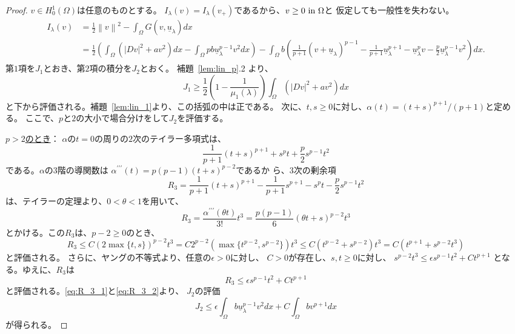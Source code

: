 \begin{proof}
 $v \in H_0^1(\Omega)$は任意のものとする。
 $I_\lambda(v) = I_\lambda(v_+)$であるから、$v \geq 0 ~\text{in}~ \Omega$と
 仮定しても一般性を失わない。
 \begin{align*}
  I_\lambda(v) &= \frac{1}{2} \left\| v \right\|^2 - \int_\Omega G(v,
  \underline{u}_\lambda)dx \\
  &= \frac{1}{2} \left( \int_\Omega \left( \lvert Dv \rvert^2 + a v^2
  \right) dx -\int_\Omega pb\underline{u}_\lambda^{p-1} v^2 dx
  \right)
  - \int_\Omega b \left( \frac{1}{p+1}(v +
  \underline{u}_\lambda)^{p-1} - \frac{1}{p+1}
  \underline{u}_\lambda^{p+1} - \underline{u}_\lambda^p v -
  \frac{p}{2} \underline{u}_\lambda^{p-1} v^2 \right) dx.
 \end{align*}
 第$1$項を$J_1$とおき、第$2$項の積分を$J_2$とおく。
 補題~\ref{lem:lin_p}.2 より、
 \begin{equation}
  J_1 \geq \frac{1}{2} \left( 1 - \frac{1}{\mu_1(\lambda)} \right)
   \int_\Omega \left( \lvert Dv \rvert^2 + a v^2 \right) dx \label{eq:J1}
 \end{equation}
 と下から評価される。補題~\ref{lem:lin_1}より、この括弧の中は正である。
 次に、$t, s \geq 0$に対し、$\alpha(t) = (t+s)^{p+1}/(p+1)$と定める。
 ここで、$p$と$2$の大小で場合分けをして$J_2$を評価する。

 \underline{{$p > 2$}のとき}：
 $\alpha$の$t = 0$の周りの$2$次のテイラー多項式は、
 \[
 \frac{1}{p+1} (t+s)^{p+1} + s^p t + \frac{p}{2}s^{p-1}t^2
 \]
 である。$\alpha$の$3$階の導関数は
 $\alpha^{\prime\prime\prime}(t) = p(p-1)(t+s)^{p-2}$であるか
 ら、$3$次の剰余項
 \begin{equation}
  R_3 = \frac{1}{p+1}(t+s)^{p+1} - 
 \frac{1}{p+1} s^{p+1} - s^p t - \frac{p}{2}s^{p-1}t^2 \label{eq:R_3_1}
 \end{equation}
 は、テイラーの定理より、$0 < \theta < 1$を用いて、
 \[
  R_3 = \frac{\alpha^{\prime\prime\prime}(\theta t)}{3!} t^3 =
 \frac{p(p-1)}{6} (\theta t + s)^{p-2} t^3
 \]
 とかける。この$R_3$は、$p - 2 \geq 0$のとき、
 \begin{equation}  
  R_3  \leq C (2 \max \{ t, s \})^{p-2} t^3 
   = C 2^{p-2} ( \max \{ t^{p-2}, s^{p-2} \})t^3
   \leq  C ( t^{p-2} + s^{p-2} )t^3
   = C ( t^{p+1} + s^{p-2} t^3) \label{eq:R_3_2_pow}
 \end{equation}
 と評価される。
 さらに、ヤングの不等式より、任意の$\epsilon > 0$に対し、
 $C > 0$が存在し、$s, t \geq 0$に対し、
 $s^{p-2} t^3 \leq \epsilon s^{p-1} t^2 + C t^{p+1}$
 となる。ゆえに、$R_3$は
 \begin{equation}
  R_3 \leq \epsilon s^{p-1}t^2 + C t^{p+1} \label{eq:R_3_2}
 \end{equation}
 と評価される。\eqref{eq:R_3_1}と\eqref{eq:R_3_2}より、
 $J_2$の評価
 \begin{equation}
  J_2 \leq \epsilon \int_\Omega b \underline{u}_\lambda^{p-1} v^2 dx +
   C \int_\Omega b v^{p+1} dx \label{eq:J2}
 \end{equation}
 が得られる。


\end{proof}
